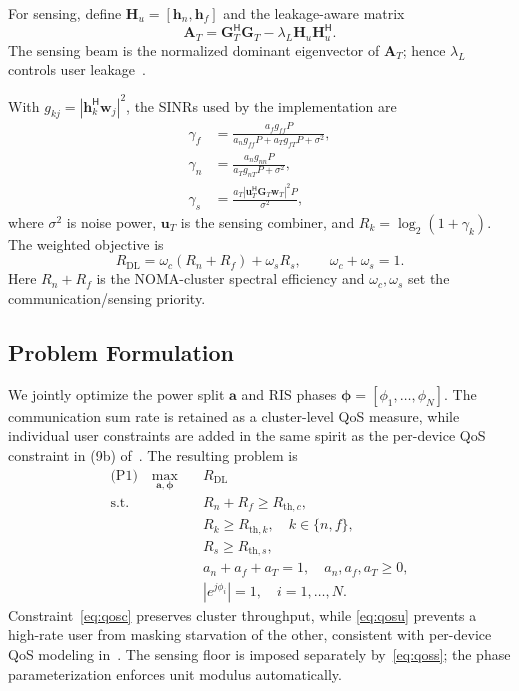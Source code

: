 \documentclass[10pt,journal]{IEEEtran}
\newcommand{\Rdl}{R_{\mathrm{DL}}}
\newcommand{\bh}{\bm{h}}
\newcommand{\bw}{\bm{w}}
\newcommand{\bG}{\bm{G}}
\newcommand{\bH}{\bm{H}}
\newcommand{\bA}{\bm{A}}
\newcommand{\herm}{^{\mathsf{H}}}
\begin{document}
For sensing, define $\bH_u=[\bh_n,\bh_f]$ and the leakage-aware matrix
\begin{equation}
\bA_T=\bG_T\herm\bG_T-\lambda_L\bH_u\bH_u\herm. \label{eq:wTmat}
\end{equation}
The sensing beam is the normalized dominant eigenvector of $\bA_T$; hence
$\lambda_L$ controls user leakage~\cite{wang2025hybrid,lyu2024crb}.

With $g_{kj}=|\bh_k\herm\bw_j|^2$, the SINRs used by the implementation are
\begin{align}
\gamma_f &= \frac{a_fg_{ff}P}{a_ng_{ff}P+a_Tg_{fT}P+\sigma^2}, \label{eq:gf}\\
\gamma_n &= \frac{a_ng_{nn}P}{a_Tg_{nT}P+\sigma^2}, \label{eq:gn}\\
\gamma_s &= \frac{a_T|\bm u_T\herm\bG_T\bw_T|^2P}{\sigma^2}, \label{eq:gs}
\end{align}
where $\sigma^2$ is noise power, $\bm u_T$ is the sensing combiner, and
$R_k=\log_2(1+\gamma_k)$. The weighted objective is
\begin{equation}
\Rdl=\omega_c(R_n+R_f)+\omega_sR_s,\qquad \omega_c+\omega_s=1.
\label{eq:rdl}
\end{equation}
Here $R_n+R_f$ is the NOMA-cluster spectral efficiency and
$\omega_c,\omega_s$ set the communication/sensing priority.

\subsection{Problem Formulation}\label{sec:prob}
We jointly optimize the power split $\bm{a}$ and RIS phases
$\bm{\phi}=[\phi_1,\ldots,\phi_N]$. The communication sum rate is retained as a
cluster-level QoS measure, while individual user constraints are added in the
same spirit as the per-device QoS constraint in (9b) of~\cite{zou2023ml}. The
resulting problem is
\begin{subequations}\label{eq:prob}
\begin{align}
\text{(P1)}\quad \max_{\bm{a},\bm{\phi}}\quad & \Rdl \label{eq:obj}\\
\text{s.t.}\quad
& R_n+R_f\geq R_{\mathrm{th},c}, \label{eq:qosc}\\
& R_k\geq R_{\mathrm{th},k},\quad k\in\{n,f\}, \label{eq:qosu}\\
& R_s\geq R_{\mathrm{th},s}, \label{eq:qoss}\\
& a_n+a_f+a_T=1,\quad a_n,a_f,a_T\geq0, \label{eq:simplex}\\
& |e^{j\phi_i}|=1,\quad i=1,\ldots,N. \label{eq:unit}
\end{align}
\end{subequations}
Constraint~\eqref{eq:qosc} preserves cluster throughput, while
\eqref{eq:qosu} prevents a high-rate user from masking starvation of the other,
consistent with per-device QoS modeling in~\cite{zou2023ml}. The sensing floor
is imposed separately by~\eqref{eq:qoss}; the phase parameterization enforces
unit modulus automatically.
\end{document}
